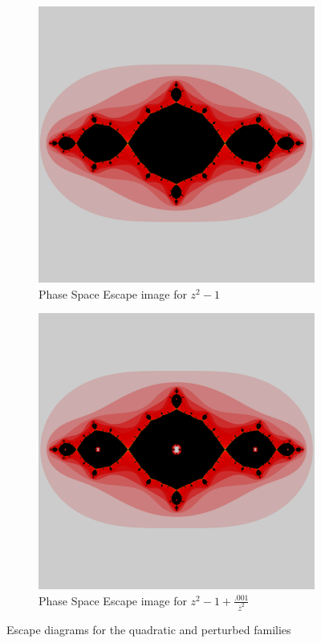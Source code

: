 \begin{figure}[h]
	\begin{subfigure}[b]{0.4\textwidth}
			\includegraphics[width=\textwidth]{./img/phase1}
			\caption{Phase Space Escape image for $z^2 - 1$}
			\label{stande2}%
	\end{subfigure}
	\begin{subfigure}[b]{0.4\textwidth}
			\includegraphics[width=\textwidth]{./img/phase2}
			\caption{Phase Space Escape image for $z^2 - 1 + \frac{.001}{\overline{z}^2}$}
			\label{perte2}
	\end{subfigure}%
	\caption{Escape diagrams for the quadratic and perturbed families}\label{fig:escape}
\end{figure}

\FloatBarrier

